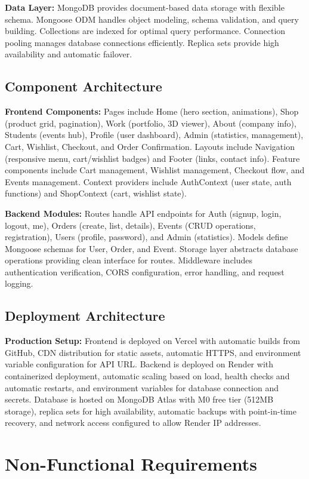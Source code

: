 ﻿\documentclass[11pt]{article}
\begin{document}
\textbf{Data Layer:} MongoDB provides document-based data storage with flexible schema. Mongoose ODM handles object modeling, schema validation, and query building. Collections are indexed for optimal query performance. Connection pooling manages database connections efficiently. Replica sets provide high availability and automatic failover.

\subsection{Component Architecture}
\textbf{Frontend Components:} Pages include Home (hero section, animations), Shop (product grid, pagination), Work (portfolio, 3D viewer), About (company info), Students (events hub), Profile (user dashboard), Admin (statistics, management), Cart, Wishlist, Checkout, and Order Confirmation. Layouts include Navigation (responsive menu, cart/wishlist badges) and Footer (links, contact info). Feature components include Cart management, Wishlist management, Checkout flow, and Events management. Context providers include AuthContext (user state, auth functions) and ShopContext (cart, wishlist state).

\textbf{Backend Modules:} Routes handle API endpoints for Auth (signup, login, logout, me), Orders (create, list, details), Events (CRUD operations, registration), Users (profile, password), and Admin (statistics). Models define Mongoose schemas for User, Order, and Event. Storage layer abstracts database operations providing clean interface for routes. Middleware includes authentication verification, CORS configuration, error handling, and request logging.

\subsection{Deployment Architecture}
\textbf{Production Setup:} Frontend is deployed on Vercel with automatic builds from GitHub, CDN distribution for static assets, automatic HTTPS, and environment variable configuration for API URL. Backend is deployed on Render with containerized deployment, automatic scaling based on load, health checks and automatic restarts, and environment variables for database connection and secrets. Database is hosted on MongoDB Atlas with M0 free tier (512MB storage), replica sets for high availability, automatic backups with point-in-time recovery, and network access configured to allow Render IP addresses.

\section{Non-Functional Requirements}
\end{document}
